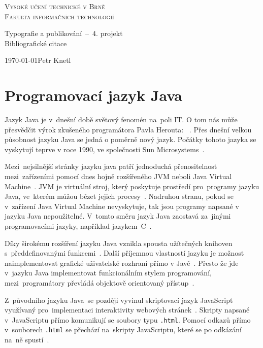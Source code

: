 \documentclass[a4paper, 11pt]{article}
\begin{document}
\begin{center} 
\Huge
\textsc{Vysoké učení
technické v Brně\\ \huge Fakulta informačních technologií}\\

\LARGE Typografie a publikov\'{a}n\'{i} \,--\, 4. projekt\\
\Huge Bibliografické citace
\end{center}
{\Large \today \hfill Petr Knetl}
\newpage
{}
\section*{Programovací jazyk Java}
Jazyk Java je v~dnešní době světový fenomén na~poli IT. O tom nás může přesvědčit výrok zkušeného programátora Pavla Herouta: ~\cite{PHerJAVA}. Přes dnešní velkou působnost jazyku Java se jedná o poměrně nový jazyk. Počátky tohoto jazyka se vyskytují teprve v roce 1990, ve společnosti Sun Microsystems~\cite{JAVAhist}.

Mezi~nejsilnější stránky jazyku java patří jednoduchá přenositelnost mezi~zařízeními pomocí dnes hojně rozšířeného JVM neboli Java Virtual Machine~\cite{BogdanKiszka}. JVM je virtuální stroj, který poskytuje prostředí pro~programy jazyku Java, ve~kterém můžou bězet jejich procesy~\cite{JAVAjvm}. Nadruhou stranu, pokud se v~zařízení Java Virtual Machine nevyskytuje, tak jsou programy napsané v jazyku Java nepoužitelné. V~tomto směru jazyk Java zaostavá za~jinými programovacími jazyky, například jazykem~C~\cite{IanDarwin}.

Díky širokému rozšíření jazyku Java vznikla spousta užítečných knihoven s~předdefinovanými funkcemi~\cite{PHerJAVAlibs}. Další příjemnou vlastností jazyku je možnost naimplementovat grafické uživatelské rozhraní přímo v Javě~\cite{PHerJAVAgui}. Přesto že jde v~jazyku Java implementovat funkcionálním stylem programování, mezi~programátory převládá objektově orientovaný přístup~\cite{BruceEckel}.

Z~původního jazyku Java~se později vyvinul skriptovací jazyk JavaScript využívaný pro~implementaci interaktivity webových stránek~\cite{DaveThau}. Skripty napsané v~JavaScriptu přímo komunikují se soubory typu \texttt{.html}. Pomocí odkazů přímo v~souborech \texttt{.html} se přechází na~skripty JavaScriptu, které se po odkázání na~ně spustí~\cite{JSweb}.
\newpage

\end{document}
